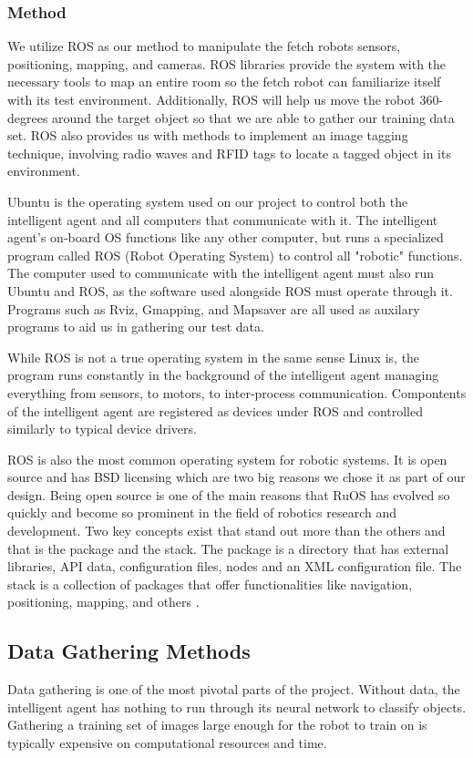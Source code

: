 \documentclass[draftclsnofoot, onecolumn, 10pt, compsoc]{IEEEtran}
\begin{document}
			\subsubsection{Method}
				We utilize ROS as our method to manipulate the fetch robots sensors, positioning, mapping, and cameras. ROS libraries provide the system with the necessary tools to map an entire room so the fetch robot can familiarize itself with its test environment. Additionally, ROS will help us move the robot 360-degrees around the target object so that we are able to gather our training data set. ROS also provides us with methods to implement an image tagging technique, involving radio waves and RFID tags to locate a tagged object in its environment.	
			
				Ubuntu is the operating system used on our project to control both the intelligent agent and all computers that communicate with it. The intelligent agent's on-board OS functions like any other computer, but runs a specialized program called ROS (Robot Operating System) to control all "robotic" functions. The computer used to communicate with the intelligent agent must also run Ubuntu and ROS, as the software used alongside ROS must operate through it. Programs such as Rviz, Gmapping, and Mapsaver are all used as auxilary programs to aid us in gathering our test data. 
				
				While ROS is not a true operating system in the same sense Linux is, the program runs constantly in the background of the intelligent agent managing everything from sensors, to motors, to inter-process communication. Compontents of the intelligent agent are registered as devices under ROS and controlled similarly to typical device drivers. 
				
				ROS is also the most common operating system for robotic systems. It is open source and has BSD licensing which are two big reasons we chose it as part of our design. Being open source is one of the main reasons that RuOS has evolved so quickly and become so prominent in the field of robotics research and development. Two key concepts exist that stand out more than the others and that is the package and the stack. The package is a directory that has external libraries, API data, configuration files, nodes and an XML configuration file. The stack is a collection of packages that offer functionalities like navigation, positioning, mapping, and others \cite{ROSintro}.
			
		\subsection{Data Gathering Methods}
			Data gathering is one of the most pivotal parts of the project. Without data, the intelligent agent has nothing to run through its neural network to classify objects. Gathering a training set of images large enough for the robot to train on is typically expensive on computational resources and time.
			
\end{document}
